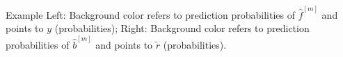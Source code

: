 \begin{frame}{Example}
Left: Background color refers to prediction probabilities of $\hat{f}^{[m]}$ and points to $y$ (probabilities);  
Right: Background color refers to prediction probabilities of $\hat{b}^{[m]}$ and points to $\tilde{r}$ (probabilities). 

\vfill




\end{frame}
